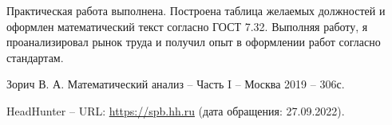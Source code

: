 \documentclass[14pt]{extreport}
\begin{document}
\conclusions

Практическая работа выполнена. Построена таблица желаемых должностей и оформлен математический текст согласно ГОСТ 7.32. Выполняя работу, я проанализировал рынок труда и получил опыт в оформлении работ согласно стандартам.

\newpage
\begin{thebibliography}{99}
	 	Зорич В. А. Математический анализ – Часть I – Москва 2019 – 306с.
	
	 	HeadHunter – URL: \url{https://spb.hh.ru} (дата обращения: 27.09.2022).
\end{thebibliography}
\end{document}
